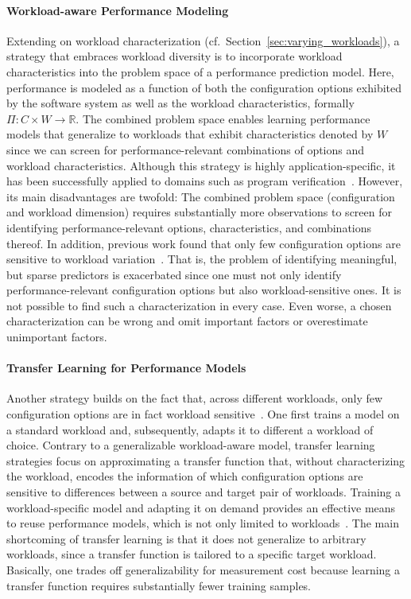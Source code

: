 {\paragraph{Workload-aware Performance Modeling}
\label{sec:workload-aware}
Extending on workload characterization (cf.~Section~\ref{sec:varying_workloads}), a strategy that embraces workload diversity is to incorporate workload characteristics into the problem space of a performance prediction model. Here, performance is modeled as a function of both the configuration options exhibited by the software system as well as the workload characteristics, formally $\Pi: C \times W \rightarrow \mathbb{R}$.
The combined problem space enables learning performance models that generalize to workloads that exhibit characteristics denoted by $W$ since we can screen for performance-relevant combinations of options and workload characteristics. Although this strategy is highly application-specific, it has been successfully applied to domains such as program verification~\cite{koc_satune_2021}. However, its main disadvantages are twofold: The combined problem space (configuration and workload dimension) requires substantially more observations to screen for identifying performance-relevant options, characteristics, and combinations thereof. In addition, previous work  found that  only few configuration options are sensitive to workload variation~\cite{jamishidi_transfer_2017}. That is, the problem of identifying meaningful, but sparse predictors is exacerbated since one must not only identify performance-relevant configuration options but also workload-sensitive ones. {\color{black} It is not possible to find such a characterization in every case. Even worse, a chosen characterization can be wrong and omit important factors or overestimate unimportant factors.}


\paragraph{Transfer Learning for Performance Models}\label{sec:transfer}
Another strategy builds on the fact that, across different workloads, only few configuration options are in fact workload sensitive~\cite{jamishidi_transfer_2017}. One first trains a model on a standard workload and, subsequently, adapts it to different a workload of choice. Contrary to a generalizable workload-aware model, transfer learning strategies focus on approximating a transfer function that, without characterizing the workload, encodes the information of which configuration options are sensitive to differences between a source and target pair of workloads. Training a workload-specific model and adapting it on demand provides an effective means to reuse performance models, which is not only limited to workloads~\cite{jamshidi_learning_2018, ding_bayesian_2020,valov_transferring_performance_2017,martin_transfer_2021}. The main shortcoming of transfer learning is that it does not generalize to arbitrary workloads, since a transfer function is tailored to a specific target workload. Basically, one trades off generalizability for measurement cost because learning a transfer function requires substantially fewer training samples.

}
